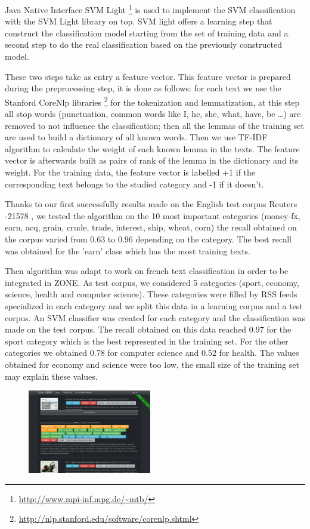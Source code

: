 \documentclass{llncs}
\begin{document}
Java Native Interface SVM Light \footnote{\url{http://www.mpi-inf.mpg.de/~mtb/}} is used to implement the SVM classification with the SVM Light library \cite{joachim:svmlight} on top. SVM light offers a learning step that construct the classification model starting from the set of training data and a second step to do the real classification based on the previously constructed model.

These two steps take as entry a feature vector. This feature vector is prepared during the preprocessing step, it is done as follows: for each text we use the Stanford CoreNlp libraries \footnote{\url{http://nlp.stanford.edu/software/corenlp.shtml}} for the tokenization and lemmatization, at this step all stop words (punctuation, common words like I, he, she, what, have, be …) are removed to not influence the classification; then all the lemmas of the training set are used to build a dictionary of all known words. Then we use TF-IDF algorithm to calculate the weight of each known lemma in the texts. The feature vector is afterwards built as pairs of rank of the lemma in the dictionary and its weight. For the training data, the feature vector is labelled +1 if the corresponding text belongs to the studied category and -1 if it doesn't.

Thanks to our first successfully results made on the English test corpus Reuters -21578 \cite{lewis:reuters}, we tested the algorithm on the 10 most important categories (money-fx, earn, acq, grain, crude, trade, interest, ship, wheat, corn) the recall obtained on the corpus varied from 0.63 to 0.96 depending on the category. The best recall was obtained for the 'earn' class which has the most training texts.

Then algorithm was adapt to work on french text classification in order to be integrated in ZONE. As test corpus, we considered 5 categories (sport, economy, science, health and computer science). These categories were filled by RSS feeds specialized in each category and we split this data in a learning corpus and a test corpus. An SVM classifier was created for each category and the classification was made on the test corpus. The recall obtained on this data reached 0.97 for the sport category which is the best represented in the training set. For the other categories we obtained 0.78 for computer science and 0.52 for health. The values obtained for economy and science were too low, the small size of the training set may explain these values.
\begin{figure}
	\includegraphics[width=0.48\textwidth]{zone-screenshot.png}
	\label{fig:DEMO}
\end{figure}
\end{document}
